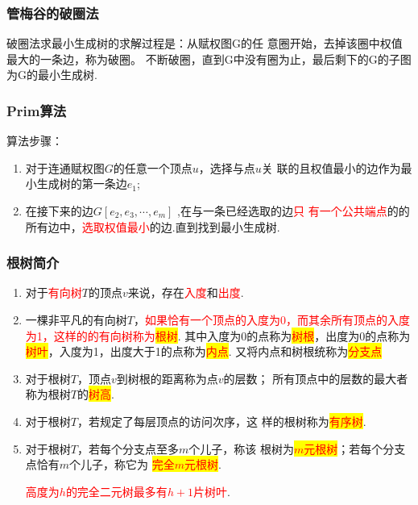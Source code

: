 \subsubsection{管梅谷的破圈法}

破圈法求最小生成树的求解过程是：从赋权图G的任
意圈开始，去掉该圈中权值最大的一条边，称为破圈。
不断破圈，直到G中没有圈为止，最后剩下的G的子图
为G的最小生成树.
\subsubsection{Prim算法}


\noindent 算法步骤：
\begin{enumerate}
	\item 对于连通赋权图$G$的任意一个顶点$u$，选择与点$u$关
	联的且权值最小的边作为最小生成树的第一条边$e_1$;
	\item 在接下来的边$G[e_2, e_3,\cdots, e_{m}]$ ,在与一条已经选取的边\textcolor{red}{只
		有一个公共端点}的的所有边中，\textcolor{red}{选取权值最小}的边.直到找到最小生成树.	
\end{enumerate}


\subsubsection{根树简介}
\begin{definition}
	\begin{enumerate}
	\item 对于\textcolor{red}{有向树}$T$的顶点$v$来说，存在\textcolor{red}{入度}和\textcolor{red}{出度}.
	\item 一棵非平凡的有向树$T$，\textcolor{red}{如果恰有一个顶点的入度为0，而其余所有顶点的入度为1，这样的的有向树称为\colorbox{yellow}{根树}}. 其中入度为0的点称为\colorbox{yellow}{\textcolor{red}{树根}}，出度为0的点称为\colorbox{yellow}{\textcolor{red}{树叶}}，入度为1，出度大于1的点称为\colorbox{yellow}{\textcolor{red}{内点}}. 又将内点和树根统称为\colorbox{yellow}{\textcolor{red}{分支点}}
	\item 对于根树$T$，顶点$v$到树根的距离称为点$v$的层数；
	所有顶点中的层数的最大者称为根树$T$的\colorbox{yellow}{\textcolor{red}{树高}}.
	\item 对于根树$T$，若规定了每层顶点的访问次序，这
	样的根树称为\colorbox{yellow}{\textcolor{red}{有序树}}.
	\item 对于根树$T$，若每个分支点至多$m$个儿子，称该
	根树为\colorbox{yellow}{\textcolor{red}{$m$元根树}}；若每个分支点恰有$m$个儿子，称它为
	\colorbox{yellow}{\textcolor{red}{完全$m$元根树}}.
	\begin{note}
		\textcolor{red}{高度为$h$的完全二元树最多有$h+1$片树叶}.
	\end{note}
\end{enumerate}
\end{definition}


